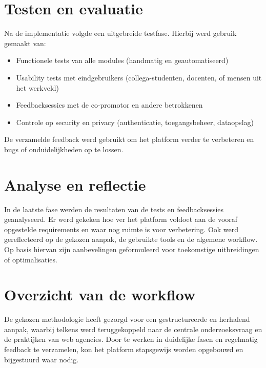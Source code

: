 \section{Testen en evaluatie}
Na de implementatie volgde een uitgebreide testfase. Hierbij werd gebruik gemaakt van:
\begin{itemize}
    \item Functionele tests van alle modules (handmatig en geautomatiseerd)
    \item Usability tests met eindgebruikers (collega-studenten, docenten, of mensen uit het werkveld)
    \item Feedbacksessies met de co-promotor en andere betrokkenen
    \item Controle op security en privacy (authenticatie, toegangsbeheer, dataopslag)
\end{itemize}

De verzamelde feedback werd gebruikt om het platform verder te verbeteren en bugs of onduidelijkheden op te lossen.

\section{Analyse en reflectie}
In de laatste fase werden de resultaten van de tests en feedbacksessies geanalyseerd. Er werd gekeken hoe ver het platform voldoet aan de vooraf opgestelde requirements en waar nog ruimte is voor verbetering. Ook werd gereflecteerd op de gekozen aanpak, de gebruikte tools en de algemene workflow. Op basis hiervan zijn aanbevelingen geformuleerd voor toekomstige uitbreidingen of optimalisaties.

\section{Overzicht van de workflow}
De gekozen methodologie heeft gezorgd voor een gestructureerde en herhalend aanpak, waarbij telkens werd teruggekoppeld naar de centrale onderzoeksvraag en de praktijken van web agencies. Door te werken in duidelijke fasen en regelmatig feedback te verzamelen, kon het platform stapsgewijs worden opgebouwd en bijgestuurd waar nodig.


